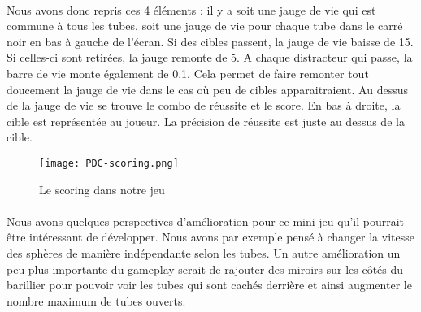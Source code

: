 \paragraph{}Nous avons donc repris ces 4 éléments : il y a soit une jauge de vie qui est commune à tous les tubes, soit une jauge de vie pour chaque tube dans le carré noir en bas à
gauche de l'écran. Si des cibles passent, la jauge de vie baisse de 15. Si celles-ci sont retirées, la jauge remonte de 5. A chaque distracteur qui passe, la barre de vie monte
également de 0.1. Cela permet de faire remonter tout doucement la jauge de vie dans le cas où peu de cibles apparaitraient. Au dessus de la jauge de vie se trouve le combo de réussite
et le score. En bas à droite, la cible est représentée au joueur. La précision de réussite est juste au dessus de la cible.

\begin{figure}[H]
    \begin{center}
    \texttt{[image: PDC-scoring.png]}
    \end{center}
    \caption{Le scoring dans notre jeu}
\label{ScoringPDCInspiration}
\end{figure}

\paragraph{}Nous avons quelques perspectives d'amélioration pour ce mini jeu qu'il pourrait être intéressant de développer. Nous avons par exemple pensé à changer la vitesse des
sphères de manière indépendante selon les tubes. Un autre amélioration un peu plus importante du gameplay serait de rajouter des miroirs sur les côtés du barillier pour pouvoir voir
les tubes qui sont cachés derrière et ainsi augmenter le nombre maximum de tubes ouverts.

\label{prototypage}